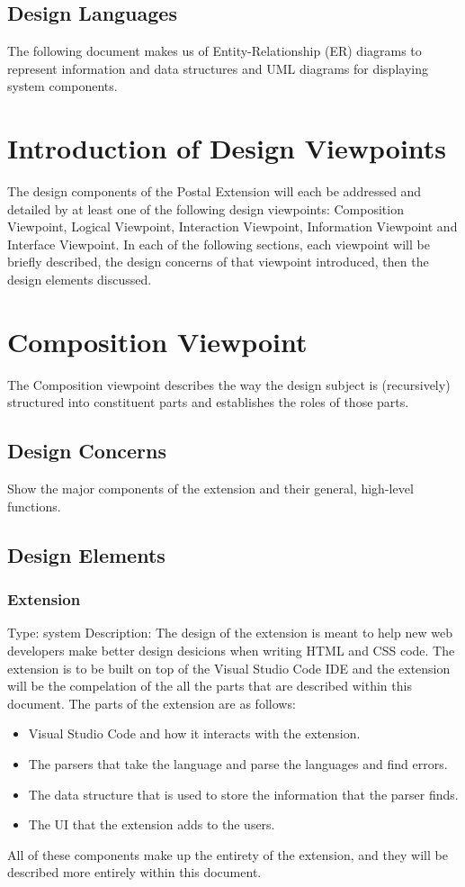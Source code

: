 \documentclass[letterpaper,10pt,titlepage,draftclsnofoot,onecolumn,onesided] {IEEEtran}
\begin{document}
\subsection{Design Languages}
The following document makes us of Entity-Relationship (ER) diagrams to represent information and data structures and UML diagrams for displaying system components. 

\section{Introduction of Design Viewpoints}
The design components of the Postal Extension will each be addressed and detailed by at least one of the following design viewpoints: Composition Viewpoint, Logical Viewpoint, Interaction Viewpoint, Information Viewpoint and Interface Viewpoint.
In each of the following sections, each viewpoint will be briefly described, the design concerns of that viewpoint introduced, then the design elements discussed.

\section{Composition Viewpoint}
The Composition viewpoint describes the way the design subject is (recursively) structured into constituent
parts and establishes the roles of those parts. 
\subsection{Design Concerns}
Show the major components of the extension and their general, high-level functions.
\subsection{Design Elements}

	\subsubsection{Extension}
	Type: system
	Description: The design of the extension is meant to help new web developers make better design desicions when writing HTML and CSS code.
	The extension is to be built on top of the Visual Studio Code IDE and the extension will be the compelation of the all the parts that are described within this document. 
	The parts of the extension are as follows:
	\begin{itemize}
	\item Visual Studio Code and how it interacts with the extension.
	\item The parsers that take the language and parse the languages and find errors.
	\item The data structure that is used to store the information that the parser finds.
	\item The UI that the extension adds to the users. 
	\end{itemize}
	All of these components make up the entirety of the extension, and they will be described more entirely within this document. 
	
\end{document}
